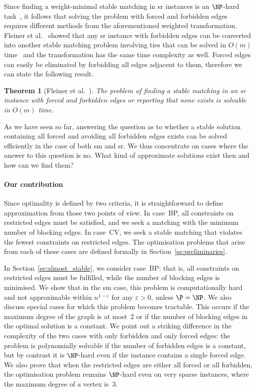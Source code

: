 \documentclass[preprint,12pt]{elsarticle}
\newtheorem{theorem}{Theorem}[section]
\begin{document}
Since finding a weight-minimal stable matching in {\sc sr} instances is an $\NP$-hard task~\cite{Fed92}, it follows that solving the problem with forced and forbidden edges requires different methods from the aforementioned weighted transformation. Fleiner et al.~\cite{FIM07} showed that any {\sc sr} instance with forbidden edges can be converted into another stable matching problem involving ties that can be solved in $O(m)$ time~\cite{IM02} and the transformation has the same time complexity as well. Forced edges can easily be eliminated by forbidding all edges adjacent to them, therefore we can state the following result.

\begin{theorem}[Fleiner et al.~\cite{FIM07}]  
\label{th:sr_decision}
The problem of finding a stable matching in an {\sc sr}  instance with forced and forbidden edges or reporting that none exists is solvable in $O(m)$ time.
\end{theorem}

As we have seen so far, answering the question as to whether a stable solution containing all forced and avoiding all forbidden edges exists can be solved efficiently in the case of both {\sc sm} and {\sc sr}. We thus concentrate on cases where the answer to this question is no. What kind of approximate solutions exist then and how can we find them?

\paragraph{Our contribution} Since optimality is defined by two criteria, it is straightforward to define approximation from those two points of view. In case~BP, all constraints on restricted edges must be satisfied, and we seek a matching with the minimum number of blocking edges. In case~CV, we seek a stable matching that violates the fewest constraints on restricted edges.  The optimisation problems that arise from each of these cases are defined formally in Section~\ref{se:preliminaries}.

In Section~\ref{se:almost_stable}, we consider case~BP: that is, all constraints on restricted edges must be fulfilled, while the number of blocking edges is minimised. We show that in the {\sc sm} case, this problem is computationally hard and not approximable within $n^{1-\varepsilon}$ for any $\varepsilon > 0$, unless $\P = \NP$. We also discuss special cases for which this problem becomes tractable. This occurs if the maximum degree of the graph is at most~2 or if the number of blocking edges in the optimal solution is a constant. We point out a striking difference in the complexity of the two cases with only forbidden and only forced edges: the problem is polynomially solvable if the number of forbidden edges is a constant, but by contrast it is $\NP$-hard even if the instance contains a single forced edge. We also prove that when the restricted edges are either all forced or all forbidden, the optimisation problem remains $\NP$-hard even on very sparse instances, where the maximum degree of a vertex is~3.
\end{document}
